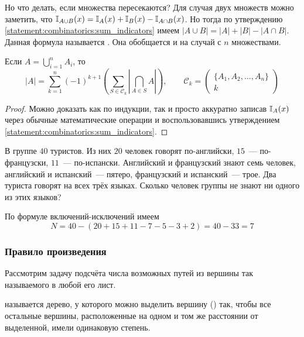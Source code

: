 Но что делать, если множества пересекаются?
Для случая двух множеств можно заметить, что $ \mathbb{I}_{A \cup B}(x) = \mathbb{I}_A(x) + \mathbb{I}_B(x) - \mathbb{I}_{A \cap B}(x) $.
Но тогда по утверждению \ref{statement:combinatorics:sum_indicators} имеем $ |A \cup B| = |A| + |B| - |A \cap B| $.
Данная формула называется .
Она обобщается и на случай с $ n $ множествами.

\begin{lemma}
    Если $ \displaystyle A = \bigcup_{i=1}^n A_i $, то
    \[
        |A| = \sum_{k=1}^n (-1)^{k+1} \left( \sum_{S \in \mathcal{C}_k} \left| \bigcap_{A \in S} A \right| \right), \qquad
        \mathcal{C}_k = \begin{pmatrix} \{ A_1, A_2, \ldots, A_n \} \\ k \end{pmatrix}
    \]
\end{lemma}

\begin{proof}
    Можно доказать как по индукции, так и просто аккуратно записав $ \mathbb{I}_A(x) $ через обычные математические операции
    и воспользовавшись утверждением \ref{statement:combinatorics:sum_indicators}.
\end{proof}

\begin{Exercise}[counter=SecExercise]
    \noindent
    В группе $ 40 $ туристов.
    Из них $ 20 $ человек говорят по-английски, $ 15 $~--- по-французски, $ 11 $~--- по-испански.
    Английский и французский знают семь человек, английский и испанский~--- пятеро, французский и испанский~--- трое.
    Два туриста говорят на всех трёх языках.
    Сколько человек группы не знают ни одного из этих языков?
\end{Exercise}

\begin{Answer}
    \noindent
    По формуле включений-исключений имеем
    \[
        N = 40 - (20 + 15 + 11 - 7 - 5 - 3 + 2) = 40 - 33 = 7
    \]
\end{Answer}

\subsubsection{Правило произведения}

Рассмотрим задачу подсчёта числа возможных путей из вершины так называемого  в любой его лист.

\begin{definition}
     называется дерево, у которого можно выделить вершину () так,
    чтобы все остальные вершины, расположенные на одном и том же расстоянии от выделенной, имели одинаковую степень.
\end{definition}

